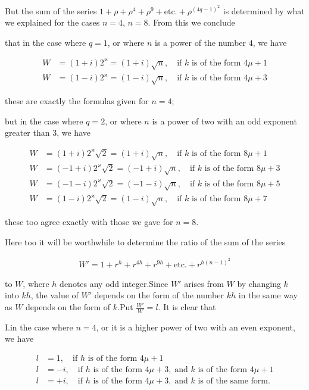 But the sum of the series $1+\rho+\rho^4+\rho^9+\text{etc.}+\rho^{(4q-1)^2}$ is determined by what we explained for the cases $n=4$, $n=8$. From this we conclude

that in the case where $q=1$, or where $n$ is a power of the number $4$, we have

\[
\begin{aligned}
W&=(1+i)2^\varkappa=(1+i)\surd n,\quad\text{if }k\text{ is of the form }4\mu+1\\
W&=(1-i)2^\varkappa=(1-i)\surd n,\quad\text{if }k\text{ is of the form }4\mu+3
\end{aligned}
\]

these are exactly the formulas given for $n=4$;

but in the case where $q=2$, or where $n$ is a power of two with an odd exponent greater than $3$, we have

\[
\begin{aligned}
W&=(1+i)2^\varkappa\surd2=(1+i)\surd n,\quad\text{if }k\text{ is of the form }8\mu+1\\
W&=(-1+i)2^\varkappa\surd2=(-1+i)\surd n,\quad\text{if }k\text{ is of the form }8\mu+3\\
W&=(-1-i)2^\varkappa\surd2=(-1-i)\surd n,\quad\text{if }k\text{ is of the form }8\mu+5\\
W&=(1-i)2^\varkappa\surd2=(1-i)\surd n,\quad\text{if }k\text{ is of the form }8\mu+7
\end{aligned}
\]

these too agree exactly with those we gave for $n=8$.


Here too it will be worthwhile to determine the ratio of the sum of the series

\[
\begin{aligned}
W'=1+r^h+r^{4h}+r^{9h}+\text{etc.}+r^{h(n-1)^2}
\end{aligned}
\]

to $W$, where $h$ denotes any odd integer.\quad Since $W'$ arises from $W$ by changing $k$ into $kh$, the value of $W'$ depends on the form of the number $kh$ in the same way as $W$ depends on the form of $k$.\quad Put $\frac{W'}{W}=l$. It is clear that

I.\quad in the case where $n=4$, or it is a higher power of two with an even exponent, we have

\[
\begin{aligned}
l&=1,\quad\text{if }h\text{ is of the form }4\mu+1\\
l&=-i,\quad\text{if }h\text{ is of the form }4\mu+3,\;\text{and }k\text{ is of the form }4\mu+1\\
l&=+i,\quad\text{if }h\text{ is of the form }4\mu+3,\;\text{and }k\text{ is of the same form.}
\end{aligned}
\]

